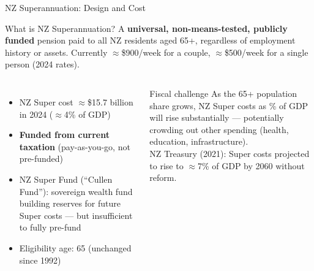 \documentclass[aspectratio=169, 12pt]{beamer}
\begin{document}
\begin{frame}{NZ Superannuation: Design and Cost}
  \begin{block}{What is NZ Superannuation?}
    A \textbf{universal, non-means-tested, publicly funded} pension paid to all NZ residents aged
    65+, regardless of employment history or assets. Currently $\approx$\$900/week for a couple,
    $\approx$\$500/week for a single person (2024 rates).
  \end{block}
  \vspace{0.3em}
  \begin{columns}
      \begin{itemize}
        \item NZ Super cost $\approx$\$15.7 billion in 2024 ($\approx$4\% of GDP)
        \item \textbf{Funded from current taxation} (pay-as-you-go, not pre-funded)
        \item NZ Super Fund (``Cullen Fund''): sovereign wealth fund building reserves for
              future Super costs --- but insufficient to fully pre-fund
        \item Eligibility age: 65 (unchanged since 1992)
      \end{itemize}
      \begin{alertblock}{Fiscal challenge}
        As the 65+ population share grows, NZ Super costs as \% of GDP will rise substantially
        --- potentially crowding out other spending (health, education, infrastructure).\\[0.3em]
        NZ Treasury (2021): Super costs projected to rise to $\approx$7\% of GDP by 2060 without
        reform.
      \end{alertblock}
  \end{columns}
\end{frame}
\end{document}
